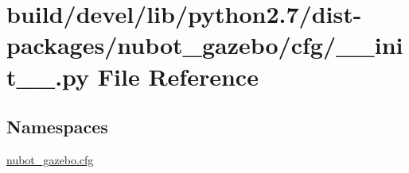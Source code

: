 \hypertarget{build_2devel_2lib_2python2_87_2dist-packages_2nubot__gazebo_2cfg_2____init_____8py}{\section{build/devel/lib/python2.7/dist-\/packages/nubot\-\_\-gazebo/cfg/\-\_\-\-\_\-init\-\_\-\-\_\-.py File Reference}
\label{build_2devel_2lib_2python2_87_2dist-packages_2nubot__gazebo_2cfg_2____init_____8py}
}
\subsection*{Namespaces}
\begin{DoxyCompactItemize}
\item 
\hyperlink{namespacenubot__gazebo_1_1cfg}{nubot\-\_\-gazebo.\-cfg}
\end{DoxyCompactItemize}
